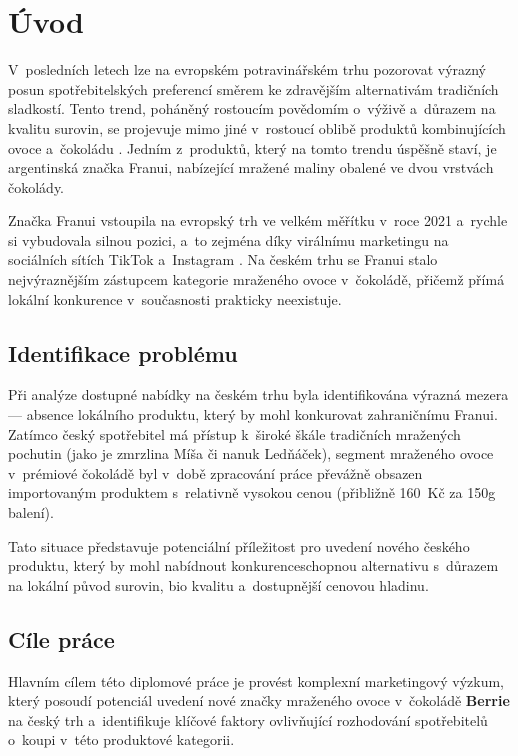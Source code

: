 \chapter{Úvod}
\label{chap:introduction}

V~posledních letech lze na evropském potravinářském trhu pozorovat výrazný posun spotřebitelských preferencí směrem ke zdravějším alternativám tradičních sladkostí. Tento trend, poháněný rostoucím povědomím o~výživě a~důrazem na kvalitu surovin, se projevuje mimo jiné v~rostoucí oblibě produktů kombinujících ovoce a~čokoládu \parencite{anselmsson_2014}. Jedním z~produktů, který na tomto trendu úspěšně staví, je argentinská značka Franui, nabízející mražené maliny obalené ve dvou vrstvách čokolády.

Značka Franui vstoupila na evropský trh ve velkém měřítku v~roce 2021 a~rychle si vybudovala silnou pozici, a~to zejména díky virálnímu marketingu na sociálních sítích TikTok a~Instagram \parencite{franui_web}. Na českém trhu se Franui stalo nejvýraznějším zástupcem kategorie mraženého ovoce v~čokoládě, přičemž přímá lokální konkurence v~současnosti prakticky neexistuje.

\section{Identifikace problému}

Při analýze dostupné nabídky na českém trhu byla identifikována výrazná mezera — absence lokálního produktu, který by mohl konkurovat zahraničnímu Franui. Zatímco český spotřebitel má přístup k~široké škále tradičních mražených pochutin (jako je zmrzlina Míša či nanuk Ledňáček), segment mraženého ovoce v~prémiové čokoládě byl v~době zpracování práce převážně obsazen importovaným produktem s~relativně vysokou cenou (přibližně 160~Kč za 150g balení).

Tato situace představuje potenciální příležitost pro uvedení nového českého produktu, který by mohl nabídnout konkurenceschopnou alternativu s~důrazem na lokální původ surovin, \gls{bio} kvalitu a~dostupnější cenovou hladinu.

\section{Cíle práce}

Hlavním cílem této diplomové práce je provést komplexní marketingový výzkum, který posoudí potenciál uvedení nové značky mraženého ovoce v~čokoládě \textbf{Berrie} na český trh a~identifikuje klíčové faktory ovlivňující rozhodování spotřebitelů o~koupi v~této produktové kategorii.

